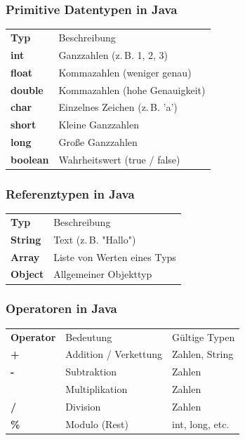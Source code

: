 \documentclass{../../presentation}
\begin{document}
\begin{frame}
  \frametitle{Primitive Datentypen in Java}
  \centering
  \begin{tabular}{>{\bfseries}l l}
    \rowcolor{tablehead}
    Typ     & Beschreibung                   \\
    int     & Ganzzahlen (z.\,B. 1, 2, 3)    \\
    float   & Kommazahlen (weniger genau)    \\
    double  & Kommazahlen (hohe Genauigkeit) \\
    char    & Einzelnes Zeichen (z.\,B. 'a') \\
    short   & Kleine Ganzzahlen              \\
    long    & Große Ganzzahlen               \\
    boolean & Wahrheitswert (true / false)   \\
  \end{tabular}
\end{frame}

\begin{frame}
  \frametitle{Referenztypen in Java}
  \centering
  \begin{tabular}{>{\bfseries}l l}
    \rowcolor{tablehead}
    Typ    & Beschreibung                \\
    String & Text (z.\,B. "Hallo")       \\
    Array  & Liste von Werten eines Typs \\
    Object & Allgemeiner Objekttyp       \\
  \end{tabular}
\end{frame}

\begin{frame}
  \frametitle{Operatoren in Java}
  \centering
  \begin{tabular}{>{\bfseries}l l l}
    \rowcolor{tablehead}
    Operator & Bedeutung             & Gültige Typen   \\
    +        & Addition / Verkettung & Zahlen, String  \\
    -        & Subtraktion           & Zahlen          \\
    *        & Multiplikation        & Zahlen          \\
    /        & Division              & Zahlen          \\
    \%       & Modulo (Rest)         & int, long, etc. \\
  \end{tabular}
\end{frame}
\end{document}
